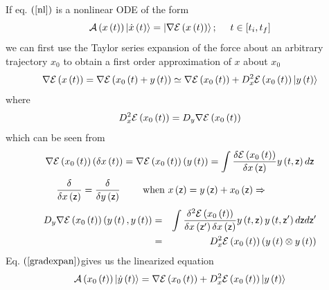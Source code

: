 If eq. $\left( \ref{nl}\right) $ is a nonlinear ODE of the form 
\begin{equation}
{\cal A}\left( x\left( t\right) \right) \left| \dot{x}\left( t\right)
\right\rangle =\left| \nabla {\cal E}\left( x\left( t\right) \right)
\right\rangle ;\quad \ t\in \left[ t_{i},t_{f}\right]
\end{equation}%
we can first use the Taylor series expansion of the force about an arbitrary
trajectory $x_{0}$ to obtain a first order approximation of $x$ about $x_{0}$
\begin{equation}
\nabla {\cal E}\left( x\left( t\right) \right) =\nabla {\cal E}\left(
x_{0}\left( t\right) +y\left( t\right) \right) \simeq \nabla {\cal E}\left(
x_{0}\left( t\right) \right) +D_{x}^{2}{\cal E}\left( x_{0}\left( t\right)
\right) \left| y\left( t\right) \right\rangle  \label{gradexpan}
\end{equation}%
where 
\begin{equation}
D_{x}^{2}{\cal E}\left( x_{0}\left( t\right) \right) =D_{y}\nabla {\cal E}%
\left( x_{0}\left( t\right) \right)
\end{equation}%
which can be seen from%
\[
\nabla {\cal E}\left( x_{0}\left( t\right) \right) \left( \delta x\left(
t\right) \right) =\nabla {\cal E}\left( x_{0}\left( t\right) \right) \left(
y\left( t\right) \right) =\int \frac{\delta {\cal E}\left( x_{0}\left(
t\right) \right) }{\delta x\left( {\sf z}\right) }y\left( t,{\sf z}\right) d%
{\sf z} 
\]%
\[
\frac{\delta }{\delta x\left( {\sf z}\right) }=\frac{\delta }{\delta y\left( 
{\sf z}\right) }\text{ }\qquad \text{when }x\left( {\sf z}\right) =y\left( 
{\sf z}\right) +x_{0}\left( {\sf z}\right) \Rightarrow \qquad \qquad 
\]%
\begin{eqnarray}
D_{y}\nabla {\cal E}\left( x_{0}\left( t\right) \right) \left( y\left(
t\right) ,y\left( t\right) \right) &=&\int \frac{\delta ^{2}{\cal E}\left(
x_{0}\left( t\right) \right) }{\delta x\left( {\sf z}^{\prime }\right)
\delta x\left( {\sf z}\right) }y\left( t,{\sf z}\right) y\left( t,{\sf z}%
^{\prime }\right) d{\sf z}d{\sf z}^{\prime }  \nonumber \\
&=&D_{x}^{2}{\cal E}\left( x_{0}\left( t\right) \right) \left( y\left(
t\right) \otimes y\left( t\right) \right)
\end{eqnarray}%
Eq. $\left( \ref{gradexpan}\right) $gives us the linearized equation 
\begin{equation}
{\cal A}\left( x_{0}\left( t\right) \right) \left| \dot{y}\left( t\right)
\right\rangle =\nabla {\cal E}\left( x_{0}\left( t\right) \right) +D_{x}^{2}%
{\cal E}\left( x_{0}\left( t\right) \right) \left| y\left( t\right)
\right\rangle
\end{equation}%
